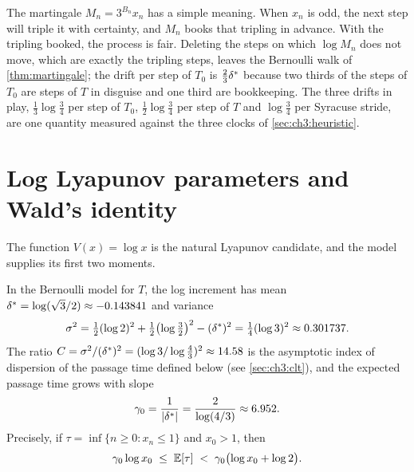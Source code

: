 The martingale $M_n=3^{B_n}x_n$ has a simple meaning. When $x_n$ is odd, the
next step will triple it with certainty, and $M_n$ books that tripling in
advance. With the tripling booked, the process is fair. Deleting the steps on
which $\log M_n$ does not move, which are exactly the tripling steps, leaves
the Bernoulli walk of \cref{thm:martingale}; the drift per step of $T_0$ is
$\tfrac23\delta^{*}$ because two thirds of the steps of $T_0$ are steps of $T$ in
disguise and one third are bookkeeping. The three drifts in play,
$\tfrac13\log\tfrac34$ per step of $T_0$, $\tfrac12\log\tfrac34$ per step of
$T$ and $\log\tfrac34$ per Syracuse stride, are one quantity measured against
the three clocks of \cref{sec:ch3:heuristic}.

\section{Log Lyapunov parameters and Wald's identity}\label{sec:ch3:lyapunov}

The function $V(x)=\log x$ is the natural Lyapunov candidate, and the model
supplies its first two moments.

\begin{proposition}\label{prop:lyapunov}
In the Bernoulli model for $T$, the log increment has mean $\delta^{*}=\log(\sqrt3/2)
\approx-0.143841$ and variance
\[
  \sigma^2=\tfrac12(\log2)^2+\tfrac12\bigl(\log\tfrac32\bigr)^2-(\delta^{*})^2
  =\tfrac14(\log3)^2\approx0.301737 .
\]
The ratio $C=\sigma^2/(\delta^{*})^2=(\log3/\log\tfrac43)^2\approx14.58$ is the
asymptotic index of dispersion of the passage time defined below
(see \cref{sec:ch3:clt}), and the expected passage time grows with slope
\[
  \gamma_0=\frac{1}{|\delta^{*}|}=\frac{2}{\log(4/3)}\approx6.952 .
\]
Precisely, if $\tau=\inf\{n\geq0:x_n\le1\}$ and $x_0>1$, then
\begin{equation}\label{eq:ch3:waldbound}
  \gamma_0\log x_0\;\le\;\mathbb{E}[\tau]\;<\;\gamma_0\bigl(\log x_0+\log2\bigr).
\end{equation}
\end{proposition}

